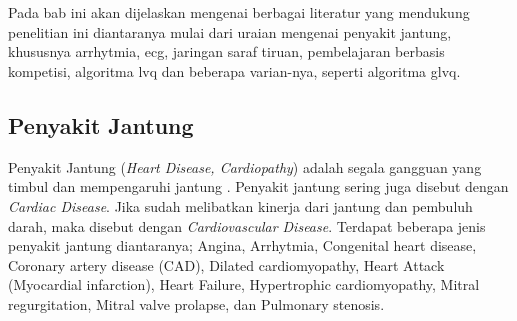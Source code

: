 \chapter{\babDua}
Pada bab ini akan dijelaskan mengenai berbagai literatur yang mendukung
penelitian ini diantaranya mulai dari uraian mengenai penyakit jantung,
khususnya \gls{arrhytmia}, \gls{ecg}, jaringan saraf tiruan, pembelajaran
berbasis kompetisi, algoritma \gls{lvq} dan beberapa varian-nya, seperti
algoritma \gls{glvq}.

\section{Penyakit Jantung}
\label{sec:jantung}
Penyakit Jantung (\textit{Heart Disease, Cardiopathy}) adalah segala gangguan
yang timbul dan mempengaruhi jantung \cite{medicinenet.1}. Penyakit jantung
sering juga disebut dengan \textit{Cardiac Disease}. Jika sudah melibatkan
kinerja dari jantung dan pembuluh darah, maka disebut dengan
\textit{Cardiovascular Disease}. Terdapat beberapa jenis penyakit jantung
diantaranya; Angina, Arrhytmia, Congenital heart disease, Coronary artery
disease (CAD), Dilated cardiomyopathy, Heart Attack (Myocardial infarction),
Heart Failure, Hypertrophic cardiomyopathy, Mitral regurgitation, Mitral valve
prolapse, dan Pulmonary stenosis. 


